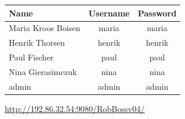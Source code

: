 

\vfill

\begin{center}


 \begin{table}[H]
     \centering
     \begin{tabular}{l|c|c}
        \textbf{Name} & \textbf{Username}  &  \textbf{Password} \\ \hline
        Maria Kroos Boisen  & maria  & maria \\
        Henrik Thorsen  & henrik  & henrik \\
        Paul Fischer  & paul  & paul \\
        Nina Gierasimczuk  & nina  & nina \\
        admin  & admin  & admin \\
     \end{tabular}
 \end{table}
 
 {\Large  \url{http://192.86.32.54:9080/RobBossv04/} }

 
\end{center}


